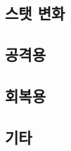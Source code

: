 \documentclass{report}
\begin{document}
	\subsection{스탯 변화}
		
	
	\subsection{공격용}
		
	
	\subsection{회복용}
		
	
	\subsection{기타}
		
\end{document}
